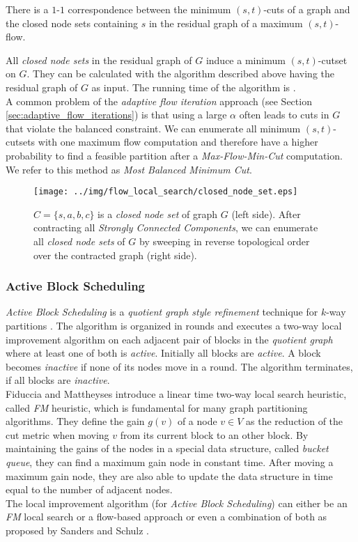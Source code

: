 \begin{theorem}
\label{theorem:mbmc}
There is a $1$-$1$ correspondence between the minimum $(s,t)$-cuts of a graph and the closed node
sets containing $s$ in the residual graph of a maximum $(s,t)$-flow.
\end{theorem}

All \emph{closed node sets} in the residual graph of $G$ induce a minimum $(s,t)$-cutset on $G$.
They can be calculated with the algorithm described above having the residual graph of
$G$ as input. The running time of the algorithm is . \\
A common problem of the \emph{adaptive flow iteration} approach (see Section \ref{sec:adaptive_flow_iterations}) is
that using a large $\alpha$ often leads to cuts in $G$ that violate the balanced constraint. 
We can enumerate all minimum $(s,t)$-cutsets with one maximum 
flow computation and therefore have a higher probability to find
a feasible partition after a \emph{Max-Flow-Min-Cut} computation. We refer to this method as
\emph{Most Balanced Minimum Cut}.
\begin{figure}
\centering
\texttt{[image: ../img/flow\_local\_search/closed\_node\_set.eps]}
\caption{$C = \{s,a,b,c\}$ is a \emph{closed node set} of graph $G$ (left side).
         After contracting all \emph{Strongly Connected Components}, we can enumerate all
         \emph{closed node sets} of $G$ by sweeping in reverse topological order over the
         contracted graph (right side).}
\label{img:closed_node_set}
\end{figure}


\subsubsection{Active Block Scheduling}
\label{sec:abs}
\emph{Active Block Scheduling} is a \emph{quotient graph style refinement} technique for
$k$-way partitions \cite{holtgrewe2010engineering,sanders2011engineering}. 
The algorithm is organized in rounds and executes a two-way 
local improvement algorithm on each adjacent pair of 
blocks in the \emph{quotient graph} where at least one of both is \emph{active}. 
Initially all blocks are \emph{active}. A block becomes \emph{inactive}
if none of its nodes move in a round. The algorithm
terminates, if all blocks are \emph{inactive}. \\
Fiduccia and Mattheyses \cite{fiduccia1988linear} introduce a linear time
two-way local search heuristic, called \emph{FM} heuristic, 
which is fundamental for many graph partitioning algorithms.
They define the gain $g(v)$ of a node $v \in V$ as the reduction of the cut metric when
moving $v$ from its current block to an other block. By maintaining the gains of the
nodes in a special data structure, called \emph{bucket queue}, they can find a maximum
gain node in constant time. After moving a maximum gain node, they are also able to update the
data structure in time equal to the number of adjacent nodes.\\
The local improvement algorithm (for \emph{Active Block Scheduling}) can either 
be an \emph{FM} local search or a flow-based approach or even a combination of 
both as proposed by Sanders and Schulz \cite{sanders2011engineering}.

